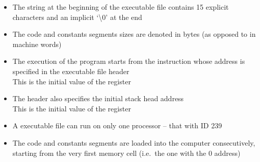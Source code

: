 \begin{itemize}
    \item The  string at the beginning of the executable file contains
    15 explicit characters and an implicit `\textbackslash 0' at the end

    \item The code and constants segments sizes are denoted in bytes
    (as opposed to in machine words)

    \item The execution of the program starts from the instruction whose address
    is specified in the executable file header \\
    This is the initial value of the  register

    \item The header also specifies the initial stack head address \\
    This is the initial value of the  register

    \item A  executable file can run on only one processor
    -- that with ID 239

    \item The code and constants segments are loaded into the 
    computer consecutively, starting from the very first memory cell
    (i.e.\ the one with the 0 address)
\end{itemize}
